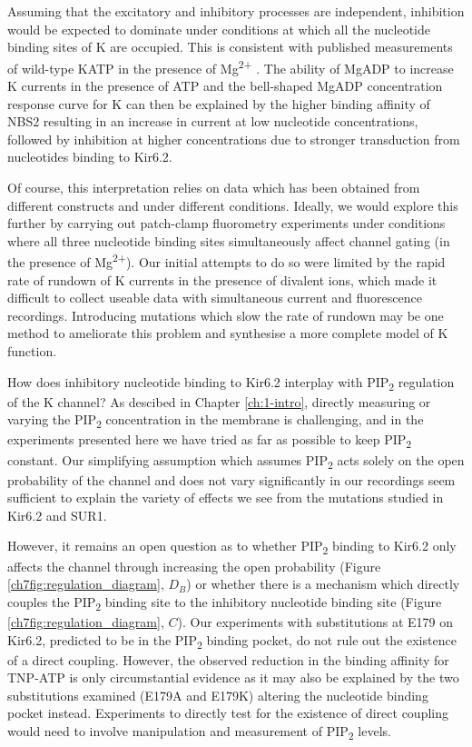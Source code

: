 Assuming that the excitatory and inhibitory processes are independent, inhibition would be expected to dominate under conditions at which all the nucleotide binding sites of K\ATP{} are occupied.
This is consistent with published measurements of wild-type KATP in the presence of Mg\textsuperscript{2+} \cite{proks_activation_2010}.
The ability of MgADP to increase K\ATP{} currents in the presence of ATP \cite{gribble_mgatp_1998-1} and the bell-shaped MgADP concentration response curve for K\ATP{} \cite{proks_activation_2010, vedovato_nucleotide-binding_2015} can then be explained by the higher binding affinity of NBS2 resulting in an increase in current at low nucleotide concentrations, followed by inhibition at higher concentrations due to stronger transduction from nucleotides binding to Kir6.2.

Of course, this interpretation relies on data which has been obtained from different constructs and under different conditions.
Ideally, we would explore this further by carrying out patch-clamp fluorometry experiments under conditions where all three nucleotide binding sites simultaneously affect channel gating (in the presence of Mg\textsuperscript{2+}).
Our initial attempts to do so were limited by the rapid rate of rundown of K\ATP{} currents in the presence of divalent ions, which made it difficult to collect useable data with simultaneous current and fluorescence recordings.
Introducing mutations which slow the rate of rundown may be one method to ameliorate this problem and synthesise a more complete model of K\ATP{} function.

How does inhibitory nucleotide binding to Kir6.2 interplay with PIP\textsubscript{2} regulation of the K\ATP{} channel?
As descibed in Chapter \ref{ch:1-intro}, directly measuring or varying the PIP\textsubscript{2} concentration in the membrane is challenging, and in the experiments presented here we have tried as far as possible to keep PIP\textsubscript{2} constant.
Our simplifying assumption which assumes PIP\textsubscript{2} acts solely on the open probability of the channel and does not vary significantly in our recordings seem sufficient to explain the variety of effects we see from the mutations studied in Kir6.2 and SUR1.

However, it remains an open question as to whether PIP\textsubscript{2} binding to Kir6.2 only affects the channel through increasing the open probability (Figure \ref{ch7fig:regulation_diagram}, $D_B$) or whether there is a mechanism which directly couples the PIP\textsubscript{2} binding site to the inhibitory nucleotide binding site (Figure \ref{ch7fig:regulation_diagram}, $C$).
Our experiments with substitutions at E179 on Kir6.2, predicted to be in the PIP\textsubscript{2} binding pocket, do not rule out the existence of a direct coupling.
However, the observed reduction in the binding affinity for TNP-ATP is only circumstantial evidence as it may also be explained by the two substitutions examined (E179A and E179K) altering the nucleotide binding pocket instead.
Experiments to directly test for the existence of direct coupling would need to involve manipulation and measurement of PIP\textsubscript{2} levels.

